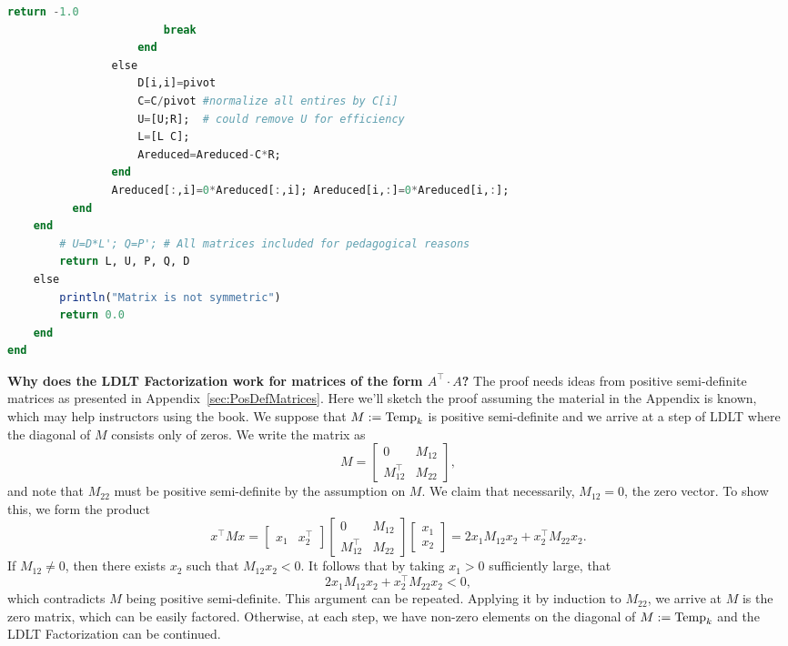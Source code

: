 \begin{lstlisting}[language=Julia,style=mystyle]
                        return -1.0
                        break
                    end
                else
                    D[i,i]=pivot
                    C=C/pivot #normalize all entires by C[i]
                    U=[U;R];  # could remove U for efficiency
                    L=[L C];
                    Areduced=Areduced-C*R;
                end
                Areduced[:,i]=0*Areduced[:,i]; Areduced[i,:]=0*Areduced[i,:];
          end 
    end
        # U=D*L'; Q=P'; # All matrices included for pedagogical reasons
        return L, U, P, Q, D
    else 
        println("Matrix is not symmetric")
        return 0.0
    end
end
\end{lstlisting}

\textbf{Why does the LDLT Factorization work for matrices of the form $A^\top \cdot A$?} The proof needs ideas from positive semi-definite matrices as presented in Appendix~\ref{sec:PosDefMatrices}. Here we'll sketch the proof assuming the material in the Appendix is known, which may help instructors using the book. We suppose that $M:={\rm Temp}_k$ is positive semi-definite and we arrive at a step of LDLT where the diagonal of $M$ consists only of zeros. We write the matrix as
$$ M=\left[ \begin{array}{cc} 0 & M_{12}\\ M_{12}^\top & M_{22} \end{array}  \right], $$ and note that $M_{22}$ must be positive semi-definite by the assumption on $M$. We claim that necessarily, $M_{12}=0$, the zero vector. To show this, we form the product
$$ x^\top M x = \left[ \begin{array}{cc} x_1 & x_2^\top \end{array} \right] \left[ \begin{array}{cc} 0 & M_{12}\\ M_{12}^\top & M_{22} \end{array} \right] \left[ \begin{array}{c}x_1 \\ x_2 \end{array}  \right] = 2 x_1 M_{12} x_2 + x_2^\top M_{22} x_2. $$
If $M_{12}\neq 0$, then there exists $x_2$ such that $ M_{12} x_2 < 0$. It follows that by taking $x_1>0$ sufficiently large, that
$$2 x_1 M_{12} x_2 + x_2^\top M_{22} x_2 <0, $$
which contradicts $M$ being positive semi-definite. This argument can be repeated. Applying it by induction to $M_{22}$, we arrive at $M$ is the zero matrix, which can be easily factored. Otherwise, at each step, we have non-zero elements on the diagonal of $M:={\rm Temp}_k$ and the LDLT Factorization can be continued. 

